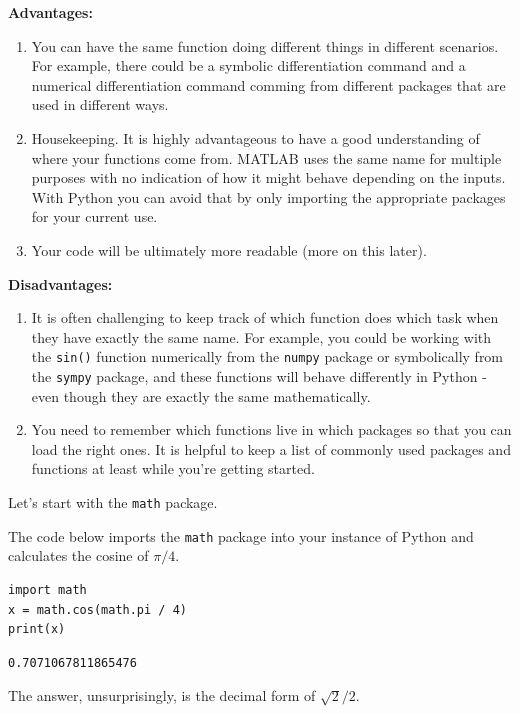 {\bf Advantages:}
\begin{enumerate}
    \item You can have the same function doing different things in different scenarios.
        For example, there could be a symbolic differentiation command and a numerical
        differentiation command comming from different packages that are used in different
        ways.
    \item Housekeeping.  It is highly advantageous to have a good understanding of where
        your functions come from.  MATLAB uses the same name for multiple purposes with no
        indication of how it might behave depending on the inputs.  With Python you can
        avoid that by only importing the appropriate packages for your current use.
    \item Your code will be ultimately more readable (more on this later).
\end{enumerate}

{\bf Disadvantages:}
\begin{enumerate}
    \item It is often challenging to keep track of which function does which task when
        they have exactly the same name.  For example, you could be working with the
        \texttt{sin()} function numerically from the \texttt{numpy} package or
        symbolically from the \texttt{sympy} package, and these functions will behave differently in Python - even though they are exactly the same mathematically.
    \item You need to remember which functions live in which packages so that you can load the right ones.  It is helpful to keep a list of commonly used packages and functions at least while you're getting started.
\end{enumerate}

Let's start with the \texttt{math} package.    

\begin{example}
The code below imports the \texttt{math}
package into your instance of Python and calculates the cosine of $\pi/4$.

\bcode
\begin{lstlisting}
import math
x = math.cos(math.pi / 4)
print(x)
\end{lstlisting}
\boutput
\begin{lstlisting}
0.7071067811865476
\end{lstlisting}
The answer, unsurprisingly, is the decimal form of $\sqrt{2}/2$.
\end{example}

